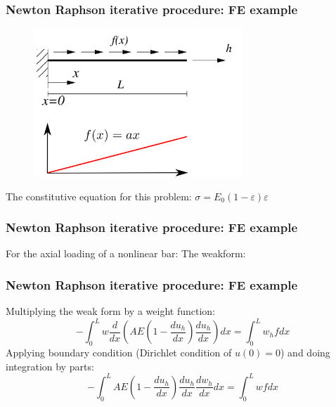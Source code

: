\documentclass[notes]{beamer}
\begin{document}
\begin{frame}
\frametitle{Newton Raphson iterative procedure: FE example}
\begin{figure}[ht]
	\centering
	\includegraphics[width=0.7\textwidth]{figs/strong-form-nonlinear.png}
\end{figure}
The constitutive equation for this problem: $\sigma = E_0 (1 - \varepsilon)\varepsilon$
\end{frame}

\begin{frame}
\frametitle{Newton Raphson iterative procedure: FE example}
For the axial loading of a nonlinear bar:
The weakform:
\end{frame}

\begin{frame}
\frametitle{Newton Raphson iterative procedure: FE example}
Multiplying the weak form by a weight function:
	\begin{equation*}
		-\int_0^L w \frac{d}{dx}\left(AE\left(1 - \frac{du_h}{dx}\right)\frac{du_h}{dx}\right) dx = \int_0^L w_hf dx
	\end{equation*}
Applying boundary condition (Dirichlet condition of $u(0) = 0$) and doing integration by parts:	
	\begin{equation*}
		-\int_0^L AE\left(1 - \frac{du_h}{dx}\right)\frac{du_h}{dx} \frac{dw_h}{dx} dx = \int_0^L wf dx
	\end{equation*}
\end{frame}
\end{document}
